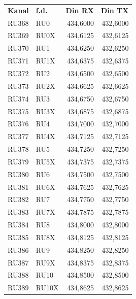 \begin{tabular}{llrr}
	\textbf{Kanal} & \textbf{f.d.} & \textbf{Din RX} & \textbf{Din TX} \\
	RU368          & RU0           &        434,6000 &        432,6000 \\
	RU369          & RU0X          &        434,6125 &        432,6125 \\
	RU370          & RU1           &        434,6250 &        432,6250 \\
	RU371          & RU1X          &        434,6375 &        432,6375 \\
	RU372          & RU2           &        434,6500 &        432,6500 \\
	RU373          & RU2X          &        434,6625 &        432,6625 \\
	RU374          & RU3           &        434,6750 &        432,6750 \\
	RU375          & RU3X          &        434,6875 &        432,6875 \\
	RU376          & RU4           &        434,7000 &        432,7000 \\
	RU377          & RU4X          &        434,7125 &        432,7125 \\
	RU378          & RU5           &        434,7250 &        432,7250 \\
	RU379          & RU5X          &        434,7375 &        432,7375 \\
	RU380          & RU6           &        434,7500 &        432,7500 \\
	RU381          & RU6X          &        434,7625 &        432,7625 \\
	RU382          & RU7           &        434,7750 &        432,7750 \\
	RU383          & RU7X          &        434,7875 &        432,7875 \\
	RU384          & RU8           &        434,8000 &        432,8000 \\
	RU385          & RU8X          &        434,8125 &        432,8125 \\
	RU386          & RU9           &        434,8250 &        432,8250 \\
	RU387          & RU9X          &        434,8375 &        432,8375 \\
	RU388          & RU10          &        434,8500 &        432,8500 \\
	RU389          & RU10X         &        434,8625 &        432,8625 \\

\end{tabular}
